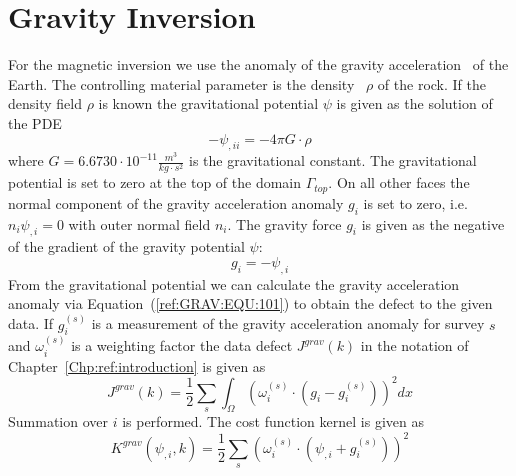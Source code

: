 
%
%
%

\section{Gravity Inversion}\label{sec:forward gravity}
For the magnetic inversion we use the anomaly of the gravity acceleration~ of the Earth.
The controlling material parameter is the density~ $\rho$ of
the rock.
If the density field $\rho$ is known the gravitational potential $\psi$ is
given as the solution of the PDE
\begin{equation}\label{ref:GRAV:EQU:100}
-\psi_{,ii} = -4\pi G \cdot  \rho
\end{equation}
where $G=6.6730 \cdot 10^{-11}  \frac{m^3}{kg \cdot s^2}$ is the gravitational
constant.
The gravitational potential is set to zero at the top of the
domain $\Gamma_{top}$.
On all other faces the normal component of the gravity acceleration anomaly
$g_i$ is set to zero, i.e. $n_i \psi_{,i} = 0$ with outer normal field $n_i$.
The gravity force $g_i$ is given as the negative of the gradient of the gravity
potential $\psi$:
\begin{equation}\label{ref:GRAV:EQU:101}
 g_i = - \psi_{,i} 
\end{equation} 
From the gravitational potential we can calculate the gravity acceleration
anomaly via Equation~(\ref{ref:GRAV:EQU:101}) to obtain the defect to the
given data.
If $g^{(s)}_i$ is a measurement of the gravity acceleration anomaly for
survey $s$ and $\omega^{(s)}_i$ is a weighting factor the data defect
$J^{grav}(k)$ in the notation of Chapter~\ref{Chp:ref:introduction} is given as
\begin{equation}\label{ref:GRAV:EQU:9}
J^{grav}(k) = \frac{1}{2}\sum_{s} \int_{\Omega} ( \omega^{(s)}_i \cdot (g_{i}- g^{(s)}_i) ) ^2 dx
\end{equation} 
Summation over $i$ is performed. 
The cost function kernel is given as
\begin{equation}\label{ref:GRAV:EQU:10}
K^{grav}(\psi_{,i},k) = \frac{1}{2}\sum_{s} ( \omega^{(s)}_i \cdot (\psi_{,i}+ g^{(s)}_i) ) ^2
\end{equation} 
